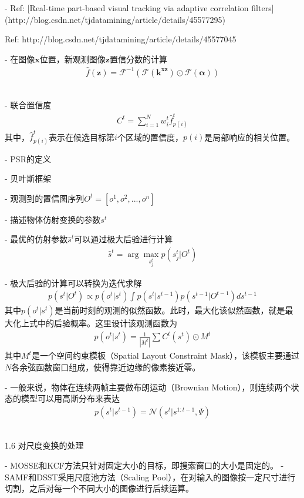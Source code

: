 - Ref: [Real-time part-based visual tracking via adaptive correlation filters](http://blog.csdn.net/tjdatamining/article/details/45577295)

Ref: http://blog.csdn.net/tjdatamining/article/details/45577045


- 在图像$\mathbf{x}$位置，新观测图像$\mathbf{z}$置信分数的计算
\begin{align}
\hat{f}(\mathbf{z})=\mathcal{F}^{-1}(\mathcal{F}(\mathbf{k}^{\mathbf{x}\mathbf{z}})\odot\mathcal{F}(\mathbf{\alpha}))
\end{align}
​

- 联合置信度
\begin{align}
C^t=\sum_{i=1}^Nw_i^t\hat{f}^t_{p(i)}
\end{align}
其中，$\hat{f}^t_{p(i)}$表示在候选目标第$i$个区域的置信度，$p(i)$是局部响应的相关位置。

- PSR的定义

- 贝叶斯框架

- 观测到的置信图序列$O^t=[o^1, o^2, ..., o^n]$

- 描述物体仿射变换的参数$s^t$ 

- 最优的仿射参数$\hat{s}^t$可以通过极大后验进行计算
\begin{align}
\hat{s}^t=\arg\max_{s^t_j}p(s^t_j|O^t)
\end{align}

- 极大后验的计算可以转换为迭代求解
\begin{align}
p(s^t|O^t)\propto p(o^t|s^t)\int p(s^t|s^{t-1})p(s^{t-1}|O^{t-1})ds^{t-1}
\end{align}
其中$ p(o^t|s^t)$是当前时刻的观测的似然函数。此时，最大化该似然函数，就是最大化上式中的后验概率。这里设计该观测函数为
\begin{align}
p(o^t|s^t)=\frac{1}{|M^t|}\sum C^t(s^t)\odot M^t
\end{align}
其中$M^t$是一个空间约束模板（Spatial Layout Constraint Mask），该模板主要通过$N$各余弦函数窗口组成，使得靠近边缘的像素接近零。

- 一般来说，物体在连续两帧主要做布朗运动（Brownian Motion），则连续两个状态的模型可以用高斯分布来表达
\begin{align}
p(s^t|s^{t-1})=\mathcal{N}(s^t|s^{1:t-1},\Psi)
\end{align}
​

1.6 对尺度变换的处理

- MOSSE和KCF方法只针对固定大小的目标，即搜索窗口的大小是固定的。
- SAMF和DSST采用尺度池方法（Scaling Pool），在对输入的图像按一定尺寸进行切割，之后对每一个不同大小的图像进行后续运算。

